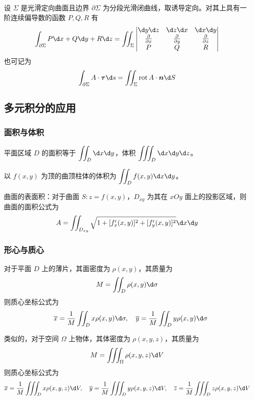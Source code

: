 \begin{theorem}[Stokes 公式]
	设 $\Sigma$ 是光滑定向曲面且边界 $\partial \Sigma$ 为分段光滑闭曲线，取诱导定向。对其上具有一阶连续偏导数的函数 $P, Q, R$ 有
	\[ \int_{\partial \Sigma} P \d x + Q \d y + R \d z = \iint_\Sigma \left| \begin{matrix}
		\d y \d z                   & \d z \d x                   & \d x \d y                   \\
		\frac{\partial}{\partial x} & \frac{\partial}{\partial y} & \frac{\partial}{\partial z} \\
		P                           & Q                           & R
	\end{matrix} \right| \]
	也可记为
	\[ \int_{\partial \Sigma} A \cdot \vbf{\tau} \d s = \iint_\Sigma \operatorname{rot} A \cdot \vbf{n} \d S \]
\end{theorem}

\subsection{多元积分的应用}

\subsubsection*{面积与体积}

平面区域 $D$ 的面积等于 $\displaystyle \iint_D \d x \d y$，体积 $\displaystyle \iiint_D \d x \d y \d z$。

以 $f(x,y)$ 为顶的曲顶柱体的体积为 $\displaystyle \iint_D f(x, y)\d x \d y$。

曲面的表面积：对于曲面 $S: z = f(x,y)$，$D_{xy}$ 为其在 $xOy$ 面上的投影区域，则曲面的面积公式为
\[ A = \iint_{D_{xy}} \sqrt{ 1 + [f_x'(x,y)]^2 + [f_y'(x,y)]^2 } \d x \d y \]


\subsubsection*{形心与质心}

对于平面 $D$ 上的薄片，其面密度为 $\rho(x, y)$，其质量为
\[ M = \iint_D \rho(x,y) \d \sigma \]
则质心坐标公式为
\[ \quad \overline{x} = \frac{1}{M}\iint_D x \rho(x,y) \d \sigma, \quad \overline{y} =\frac{1}{M}\iint_D y \rho(x,y) \d \sigma \]

类似的，对于空间 $\Omega$ 上物体，其体密度为 $\rho(x, y, z)$，其质量为
\[ M = \iiint_\Omega \rho(x,y,z) \d V \]
则质心坐标公式为
\[ \overline{x} = \frac{1}{M}\iiint_D x \rho(x,y,z) \d V, \quad \overline{y} = \frac{1}{M}\iiint_D y \rho(x,y,z) \d V, \quad \overline{z} = \frac{1}{M}\iiint_D z \rho(x,y,z) \d V \]

